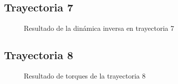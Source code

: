         \newpage
        
    \subsection{Trayectoria 7}
    
        \begin{figure}[h]
            \centering
            \caption{Resultado de la dinámica inversa en trayectoria 7}
            \label{f:cap7_tray7}
        \end{figure}
                
    \subsection{Trayectoria 8}
    
        \begin{figure}[h]
            \centering
            \caption{Resultado de torques de la trayectoria 8}
            \label{f:cap7_tray8}
        \end{figure}
        
        \newpage
        
\newpage

